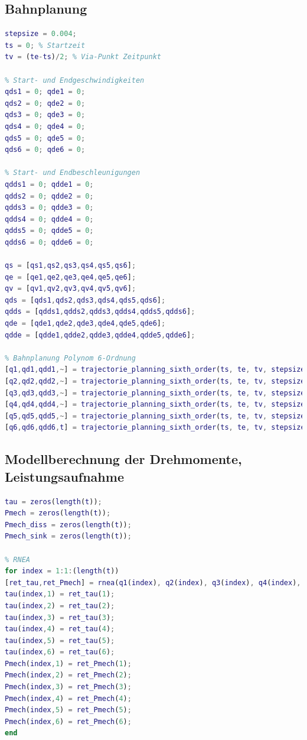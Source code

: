 \subsection{Bahnplanung}
%
\begin{lstlisting}[language=Matlab, numbers=none]
stepsize = 0.004;
ts = 0; % Startzeit
tv = (te-ts)/2; % Via-Punkt Zeitpunkt

% Start- und Endgeschwindigkeiten
qds1 = 0; qde1 = 0;
qds2 = 0; qde2 = 0;
qds3 = 0; qde3 = 0;
qds4 = 0; qde4 = 0;
qds5 = 0; qde5 = 0;
qds6 = 0; qde6 = 0;

% Start- und Endbeschleunigungen
qdds1 = 0; qdde1 = 0;
qdds2 = 0; qdde2 = 0;
qdds3 = 0; qdde3 = 0;
qdds4 = 0; qdde4 = 0;
qdds5 = 0; qdde5 = 0;
qdds6 = 0; qdde6 = 0;

qs = [qs1,qs2,qs3,qs4,qs5,qs6];
qe = [qe1,qe2,qe3,qe4,qe5,qe6];
qv = [qv1,qv2,qv3,qv4,qv5,qv6];
qds = [qds1,qds2,qds3,qds4,qds5,qds6];
qdds = [qdds1,qdds2,qdds3,qdds4,qdds5,qdds6];
qde = [qde1,qde2,qde3,qde4,qde5,qde6];
qdde = [qdde1,qdde2,qdde3,qdde4,qdde5,qdde6];

% Bahnplanung Polynom 6-Ordnung
[q1,qd1,qdd1,~] = trajectorie_planning_sixth_order(ts, te, tv, stepsize, qs(1), qds(1), qdds(1), qv(1), qe(1), qde(1), qdde(1));
[q2,qd2,qdd2,~] = trajectorie_planning_sixth_order(ts, te, tv, stepsize, qs(2), qds(2), qdds(2), qv(2), qe(2), qde(2), qdde(2));
[q3,qd3,qdd3,~] = trajectorie_planning_sixth_order(ts, te, tv, stepsize, qs(3), qds(3), qdds(3), qv(3), qe(3), qde(3), qdde(3));
[q4,qd4,qdd4,~] = trajectorie_planning_sixth_order(ts, te, tv, stepsize, qs(4), qds(4), qdds(4), qv(4), qe(4), qde(4), qdde(4));
[q5,qd5,qdd5,~] = trajectorie_planning_sixth_order(ts, te, tv, stepsize, qs(5), qds(5), qdds(5), qv(5), qe(5), qde(5), qdde(5));
[q6,qd6,qdd6,t] = trajectorie_planning_sixth_order(ts, te, tv, stepsize, qs(6), qds(6), qdds(6), qv(6), qe(6), qde(6), qdde(6));
\end{lstlisting}
%
\subsection{Modellberechnung der Drehmomente, Leistungsaufnahme}
%
\begin{lstlisting}[language=Matlab, numbers=none]
% Initialisierung
tau = zeros(length(t));
Pmech = zeros(length(t));
Pmech_diss = zeros(length(t));
Pmech_sink = zeros(length(t));

% RNEA
for index = 1:1:(length(t))
[ret_tau,ret_Pmech] = rnea(q1(index), q2(index), q3(index), q4(index), q5(index), q6(index), qd1(index), qd2(index), qd3(index), qd4(index), qd5(index), qd6(index), qdd1(index), qdd2(index), qdd3(index), qdd4(index), qdd5(index), qdd6(index));
tau(index,1) = ret_tau(1);
tau(index,2) = ret_tau(2);
tau(index,3) = ret_tau(3);
tau(index,4) = ret_tau(4);
tau(index,5) = ret_tau(5);
tau(index,6) = ret_tau(6);
Pmech(index,1) = ret_Pmech(1);
Pmech(index,2) = ret_Pmech(2);
Pmech(index,3) = ret_Pmech(3);
Pmech(index,4) = ret_Pmech(4);
Pmech(index,5) = ret_Pmech(5);
Pmech(index,6) = ret_Pmech(6);
end
\end{lstlisting}
%
